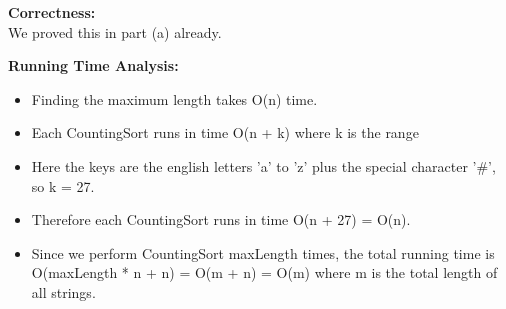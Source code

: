 \documentclass{article}
\begin{document}
\textbf{Correctness:} \\
We proved this in part (a) already.

\textbf{Running Time Analysis:}
\begin{itemize}
    \item Finding the maximum length takes O(n) time.
    \item Each CountingSort runs in time O(n + k) where k is the range
    \item Here the keys are the english letters 'a' to 'z' plus the special character '\#', so k = 27.
    \item Therefore each CountingSort runs in time O(n + 27) = O(n).
    \item Since we perform CountingSort maxLength times, the total running time is O(maxLength * n + n) = O(m + n) = O(m) where m is the total length of all strings.
\end{itemize}
\end{document}
